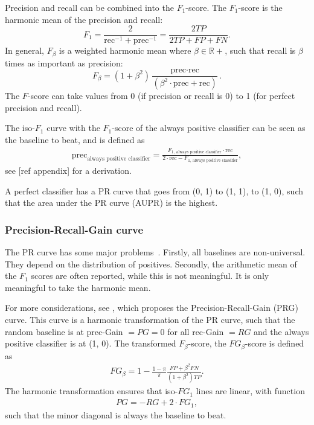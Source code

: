 Precision and recall can be combined into the $F_1$-score.
The $F_1$-score is the harmonic mean of the precision and recall:
\begin{equation}
    F_1 = \frac{2}{\text{rec}^{-1} + \text{prec}^{-1}} = \frac{2 TP}{2 TP + FP + FN}.
\end{equation}
In general, $F_\beta$ is a weighted harmonic mean where $\beta\in\mathbb{R}+$, such that recall is $\beta$ times as important as precision:
\begin{equation}
    F_\beta = (1+\beta^2)\frac{\text{prec}\cdot\text{rec}}{(\beta^2\cdot\text{prec}+\text{rec})}.
\end{equation} 
The $F$-score can take values from 0 (if precision or recall is 0) to 1 (for perfect precision and recall).

The iso-$F_1$ curve with the $F_1$-score of the always positive classifier can be seen as the baseline to beat, and is defined as
\begin{align}
    \mathrm{prec}_\text{always positive classifier} = \frac{F_{1,\,\text{always positive classifier}} \cdot \mathrm{rec}}{2\cdot\mathrm{rec} - F_{1,\,\text{always positive classifier}}},
\end{align}
see [ref appendix] for a derivation.

A perfect classifier has a PR curve that goes from (0, 1) to (1, 1), to (1, 0), such that the area under the PR curve (AUPR) is the highest.

\subsubsection{Precision-Recall-Gain curve}
The PR curve has some major problems~\cite{Flach2015}.
Firstly, all baselines are non-universal.
They depend on the distribution of positives.
Secondly, the arithmetic mean of the $F_1$ scores are often reported, while this is not meaningful.
It is only meaningful to take the harmonic mean.

For more considerations, see \textcite{Flach2015}, which proposes the Precision-Recall-Gain (PRG) curve.
This curve is a harmonic transformation of the PR curve, such that the random baseline is at $\mathrm{prec}$-Gain $ = PG = 0$ for all $\mathrm{rec}$-Gain $ = RG$ and the always positive classifier is at (1, 0).
The transformed $F_\beta$-score, the $FG_\beta$-score is defined as
\begin{align}
    FG_\beta = 1 - \frac{1 - \pi}{\pi}\frac{FP + \beta^2 FN}{(1+\beta^2)TP}.
\end{align}
The harmonic transformation ensures that iso-$FG_1$ lines are linear, with function
\begin{align}
    PG = -RG + 2 \cdot FG_1,
\end{align}
such that the minor diagonal is always the baseline to beat.


